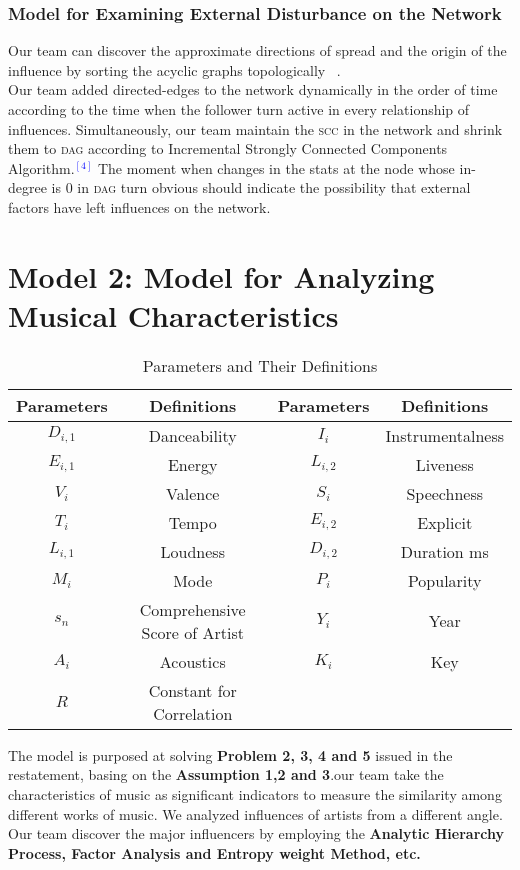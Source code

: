 \documentclass[12pt]{article}
\begin{document}
{\subsubsection{Model for Examining External Disturbance on the Network}
Our team can discover the approximate directions of spread and the origin of the influence by sorting the acyclic graphs topologically \footnotemark\ .
\\[2ex]
Our team added directed-edges to the network dynamically in the order of time according to the time when the follower turn active in every relationship of influences. Simultaneously, our team maintain the \textsc{scc} in the network and shrink them to \textsc{dag} according to Incremental Strongly Connected Components Algorithm.\textcolor{blue}{$^{[4]}$} The moment when changes in the stats at the node whose in-degree is 0 in \textsc{dag} turn obvious should indicate the possibility that external factors have left influences on the network.
\clearpage
\section{Model 2: Model for Analyzing Musical Characteristics}
\begin{table}[htp]
\centering
	\begin{tabular}{|c|c||c|c|}
		\hline
		Parameters & Definitions & Parameters & Definitions\\
		\hline
		$D_{i,1}$ & Danceability& $I_i$ &Instrumentalness\\
		$E_{i,1}$ &Energy&$L_{i,2}$ &Liveness\\
		$V_i$ &Valence&$S_i$ &Speechness\\
		$T_i$ &Tempo&$E_{i,2}$ &Explicit\\
		$L_{i,1}$ &Loudness&$D_{i,2}$ &Duration ms\\
		$M_i$ &Mode&$P_i$ &Popularity\\
		$s_n$ &Comprehensive Score of Artist&$Y_i$ &Year\\
		$A_i$ &Acoustics &$K_i$ &Key\\
		$R$ &Constant for Correlation&&\\
		\hline
	\end{tabular}
\caption{Parameters and Their Definitions}
\end{table}
The model is purposed at solving {\textbf{Problem 2, 3, 4 and 5}} issued in the restatement, basing on the {\textbf{Assumption 1,2 and 3}}.our team take the characteristics of music as significant indicators to measure the similarity among different works of music. We analyzed influences of artists from a different angle.\\[2ex]
Our team discover the major influencers by employing the {\textbf{Analytic Hierarchy Process, Factor Analysis and Entropy weight Method, etc.}}\\
}
\end{document}

